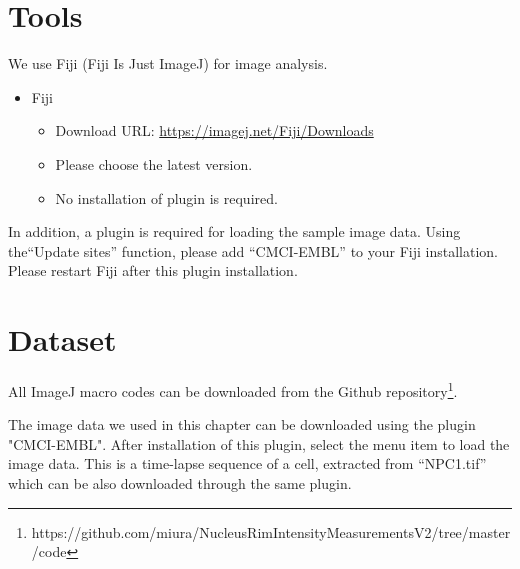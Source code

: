 \section{Tools}


We use Fiji (Fiji Is Just ImageJ) for image analysis.

\begin{itemize}
    \item Fiji
    \begin{itemize}
        \item Download URL: \url{https://imagej.net/Fiji/Downloads}
        \item Please choose the latest version. 
        \item No installation of plugin is required. 
    \end{itemize}
\end{itemize}

In addition, a plugin is required for loading the sample image data. Using the``Update sites'' function, please add ``CMCI-EMBL'' to your Fiji installation. Please restart Fiji after this plugin installation. 

\section{Dataset}



All ImageJ macro codes can be downloaded from the Github repository\footnote{https://github.com/miura/NucleusRimIntensityMeasurementsV2/tree/master/code}. 

The image data we used in this chapter can be downloaded using the plugin "CMCI-EMBL". After installation of this plugin, select the menu item  to load the image data. This is a time-lapse sequence of a cell, extracted from ``NPC1.tif'' which can be also downloaded through the same plugin. 

